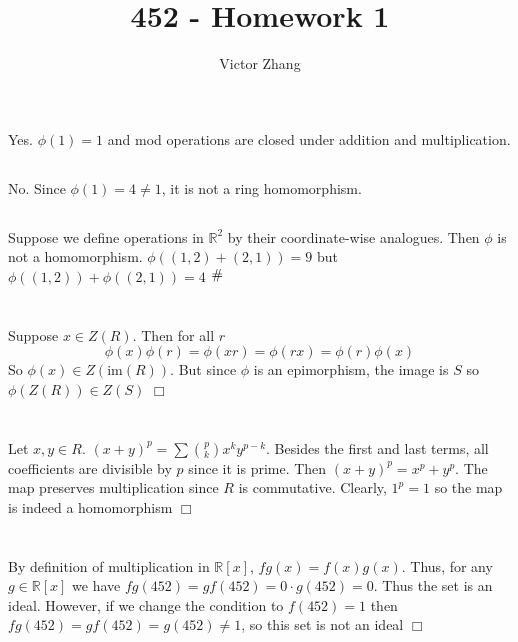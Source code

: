\documentclass{article}
\title{452 - Homework 1}
\author{Victor Zhang}
\newcommand{\contra}{\raisebox{\depth}{\#}}
\begin{document}
\maketitle

\section{}
\subsection{}
Yes. $\phi(1) = 1$ and mod operations are closed under addition and multiplication.
\subsection{}
No. Since $\phi(1) = 4 \neq 1$, it is not a ring homomorphism.
\subsection{}
Suppose we define operations in $\mathbb{R}^2$ by their coordinate-wise analogues. Then $\phi$ is not a homomorphism. $\phi((1,2)+(2,1)) = 9$ but $\phi((1,2)) + \phi((2,1)) = 4$ $\contra$

\section{}
Suppose $x \in Z(R)$. Then for all $r$
$$\phi(x)\phi(r) = \phi(xr) = \phi(rx) = \phi(r)\phi(x)$$
So $\phi(x) \in Z(\mathrm{im}(R))$. But since $\phi$ is an epimorphism, the image is $S$ so $\phi(Z(R)) \in Z(S)$ $\Box$

\section{}
Let $x,y \in R$. $(x+y)^p = \sum \binom{p}{k}x^ky^{p-k}$. Besides the first and last terms, all coefficients are divisible by $p$ since it is prime. Then $(x+y)^p = x^p + y^p$. The map preserves multiplication since $R$ is commutative. Clearly, $1^p = 1$ so the map is indeed a homomorphism $\Box$

\section{}
By definition of multiplication in $\mathbb{R}[x]$, $fg(x) = f(x)g(x)$. Thus, for any $g \in \mathbb{R}[x]$ we have $fg(452) = gf(452) = 0\cdot g(452) = 0$. Thus the set is an ideal. However, if we change the condition to $f(452) = 1$ then $fg(452) = gf(452) = g(452) \neq 1$, so this set is not an ideal $\Box$
\end{document}
